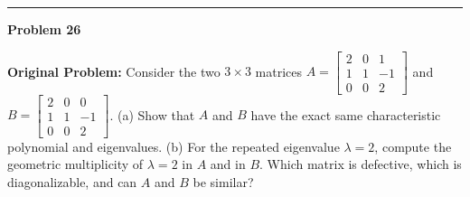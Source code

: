 \documentclass[11pt, letterpaper]{article}
\theoremstyle{definition}
\theoremstyle{remark}
\begin{document}
\noindent\rule{\textwidth}{0.4pt}

\noindent\textbf{Problem 26}

\textbf{Original Problem:} Consider the two $3 \times 3$ matrices $A = \begin{bmatrix} 2 & 0 & 1 \\ 1 & 1 & -1 \\ 0 & 0 & 2 \end{bmatrix}$ and $B = \begin{bmatrix} 2 & 0 & 0 \\ 1 & 1 & -1 \\ 0 & 0 & 2 \end{bmatrix}$. (a) Show that $A$ and $B$ have the exact same characteristic polynomial and eigenvalues. (b) For the repeated eigenvalue $\lambda = 2$, compute the geometric multiplicity of $\lambda = 2$ in $A$ and in $B$. Which matrix is defective, which is diagonalizable, and can $A$ and $B$ be similar?
\end{document}
